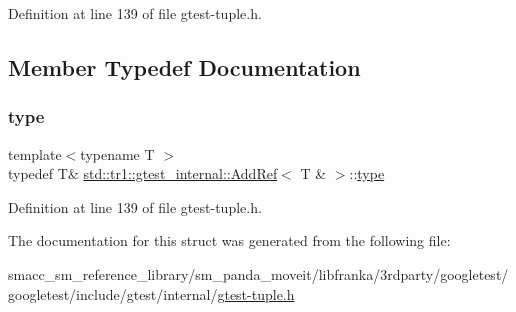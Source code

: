 Definition at line 139 of file gtest-\/tuple.\+h.



\subsection{Member Typedef Documentation}
\mbox{\label{structstd_1_1tr1_1_1gtest__internal_1_1AddRef_3_01T_01_6_01_4_a9cb3b0992c2a9e7df42d01fb64c2dc88}} 
\subsubsection{\texorpdfstring{type}{type}}
{\footnotesize\ttfamily template$<$typename T $>$ \\
typedef T\& \hyperlink{structstd_1_1tr1_1_1gtest__internal_1_1AddRef}{std\+::tr1\+::gtest\+\_\+internal\+::\+Add\+Ref}$<$ T \& $>$\+::\hyperlink{structstd_1_1tr1_1_1gtest__internal_1_1AddRef_3_01T_01_6_01_4_a9cb3b0992c2a9e7df42d01fb64c2dc88}{type}}



Definition at line 139 of file gtest-\/tuple.\+h.



The documentation for this struct was generated from the following file\+:\begin{DoxyCompactItemize}
\item 
smacc\+\_\+sm\+\_\+reference\+\_\+library/sm\+\_\+panda\+\_\+moveit/libfranka/3rdparty/googletest/googletest/include/gtest/internal/\hyperlink{gtest-tuple_8h}{gtest-\/tuple.\+h}\end{DoxyCompactItemize}
